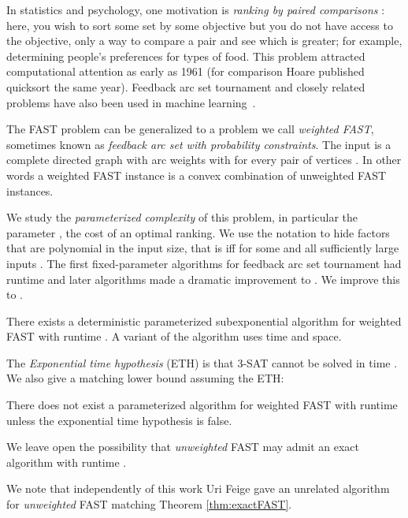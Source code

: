 \documentclass[envcountsame,oribibl]{llncs}
\newcommand{\fast}{\textsc{FAST}}
\begin{document}
In statistics and psychology, one motivation is \emph{ranking by paired comparisons} \citep{Slater61}: here, you wish to sort some set by some objective but you do not have access to the objective, only a way to compare a pair and see which is greater; for example, determining people's preferences for types of food. This problem attracted computational attention as early as 1961 \citep{Slater61} (for comparison Hoare published quicksort the same year). Feedback arc set tournament and closely related problems have also been used in machine learning~\citep{Cohen99,Ailon08aggregating}.

The \fast{} problem can be generalized to a problem we call \emph{weighted \fast{}}, sometimes known as \emph{feedback arc set with probability constraints}.
The input is a complete directed graph with arc weights  with  for every pair of vertices . In other words a weighted \fast{} instance is a convex combination of unweighted \fast{} instances.

We study the \emph{parameterized complexity} of this problem, in particular the parameter , the cost of an optimal ranking.  We use the notation  to hide factors that are polynomial in the input size, that is  iff  for some  and all sufficiently large inputs . The first fixed-parameter algorithms for feedback arc set tournament had runtime  and later algorithms made a dramatic improvement to  \cite{Alon09}. We improve this to .

\begin{theorem} \label{thm:exactFAST}
There exists a deterministic parameterized subexponential
   algorithm for weighted \fast{} with runtime . A variant of the algorithm uses  time and  space.
\end{theorem}

The \emph{Exponential time hypothesis} (ETH) \cite{Impagliazzo01} is that 3-SAT cannot be solved in time . We also give a matching lower bound assuming the ETH:

\begin{theorem} \label{thm:exactLB}
There does not exist a parameterized algorithm for weighted \fast{} with runtime  unless the exponential time hypothesis \cite{Impagliazzo01} is false.
\end{theorem}

We leave open the possibility that \emph{unweighted} \fast{} may admit an exact algorithm with runtime .

We note that independently of this work Uri Feige \cite{Feige09} gave an unrelated algorithm for \emph{unweighted} \fast{} matching Theorem \ref{thm:exactFAST}.
\end{document}
